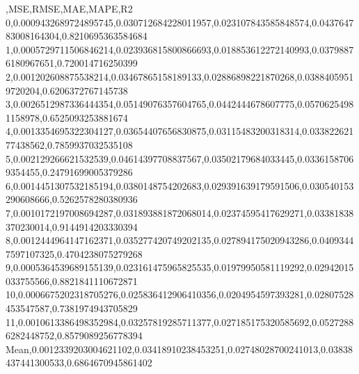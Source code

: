 ,MSE,RMSE,MAE,MAPE,R2
0,0.0009432689724895745,0.030712684228011957,0.023107843585848574,0.043764783008164304,0.8210695363584684
1,0.0005729711506846214,0.023936815800866693,0.018853612272140993,0.03798876180967651,0.720014716250399
2,0.001202608875538214,0.03467865158189133,0.02886898221870268,0.03884059519720204,0.6206372767145738
3,0.0026512987336444354,0.05149076357604765,0.0442444678607775,0.05706254981158978,0.6525093253881674
4,0.0013354695322304127,0.03654407656830875,0.03115483200318314,0.03382262177438562,0.7859937032535108
5,0.002129266621532539,0.04614397708837567,0.03502179684033445,0.03361587069354455,0.24791699005379286
6,0.0014451307532185194,0.0380148754202683,0.029391639179591506,0.030540153290608666,0.5262578280380936
7,0.0010172197008694287,0.031893881872068014,0.02374595417629271,0.03381838370230014,0.9144914203330394
8,0.0012444964147162371,0.035277420749202135,0.027894175020943286,0.04093447597107325,0.4704238075279268
9,0.0005364539689155139,0.023161475965825535,0.01979950581119292,0.02942015033755566,0.8821841110672871
10,0.0006675202318705276,0.025836412906410356,0.0204954597393281,0.02807528453547587,0.7381974943705829
11,0.0010613386498352984,0.03257819285711377,0.027185175320585692,0.05272886282448752,0.8579089256778394
Mean,0.0012339203004621102,0.03418910238453251,0.02748028700241013,0.03838437441300533,0.6864670945861402

